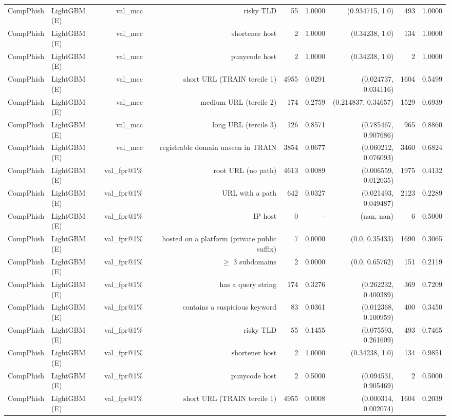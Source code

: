 \begin{table}[t]
\begin{tabular}{llrrrrrrr}
CompPhish & LightGBM (E) & val\_mcc & risky TLD & 55 & 1.0000 & (0.934715, 1.0) & 493 & 1.0000 \\
CompPhish & LightGBM (E) & val\_mcc & shortener host & 2 & 1.0000 & (0.34238, 1.0) & 134 & 1.0000 \\
CompPhish & LightGBM (E) & val\_mcc & punycode host & 2 & 1.0000 & (0.34238, 1.0) & 2 & 1.0000 \\
CompPhish & LightGBM (E) & val\_mcc & short URL (TRAIN tercile 1) & 4955 & 0.0291 & (0.024737, 0.034116) & 1604 & 0.5499 \\
CompPhish & LightGBM (E) & val\_mcc & medium URL (tercile 2) & 174 & 0.2759 & (0.214837, 0.34657) & 1529 & 0.6939 \\
CompPhish & LightGBM (E) & val\_mcc & long URL (tercile 3) & 126 & 0.8571 & (0.785467, 0.907686) & 965 & 0.8860 \\
CompPhish & LightGBM (E) & val\_mcc & registrable domain unseen in TRAIN & 3854 & 0.0677 & (0.060212, 0.076093) & 3460 & 0.6824 \\
CompPhish & LightGBM (E) & val\_fpr@1\% & root URL (no path) & 4613 & 0.0089 & (0.006559, 0.012035) & 1975 & 0.4132 \\
CompPhish & LightGBM (E) & val\_fpr@1\% & URL with a path & 642 & 0.0327 & (0.021493, 0.049487) & 2123 & 0.2289 \\
CompPhish & LightGBM (E) & val\_fpr@1\% & IP host & 0 & -- & (nan, nan) & 6 & 0.5000 \\
CompPhish & LightGBM (E) & val\_fpr@1\% & hosted on a platform (private public suffix) & 7 & 0.0000 & (0.0, 0.35433) & 1690 & 0.3065 \\
CompPhish & LightGBM (E) & val\_fpr@1\% & $\geq$ 3 subdomains & 2 & 0.0000 & (0.0, 0.65762) & 151 & 0.2119 \\
CompPhish & LightGBM (E) & val\_fpr@1\% & has a query string & 174 & 0.3276 & (0.262232, 0.400389) & 369 & 0.7209 \\
CompPhish & LightGBM (E) & val\_fpr@1\% & contains a suspicious keyword & 83 & 0.0361 & (0.012368, 0.100959) & 400 & 0.3450 \\
CompPhish & LightGBM (E) & val\_fpr@1\% & risky TLD & 55 & 0.1455 & (0.075593, 0.261609) & 493 & 0.7465 \\
CompPhish & LightGBM (E) & val\_fpr@1\% & shortener host & 2 & 1.0000 & (0.34238, 1.0) & 134 & 0.9851 \\
CompPhish & LightGBM (E) & val\_fpr@1\% & punycode host & 2 & 0.5000 & (0.094531, 0.905469) & 2 & 0.5000 \\
CompPhish & LightGBM (E) & val\_fpr@1\% & short URL (TRAIN tercile 1) & 4955 & 0.0008 & (0.000314, 0.002074) & 1604 & 0.2039 \\

\end{tabular}
\end{table}
